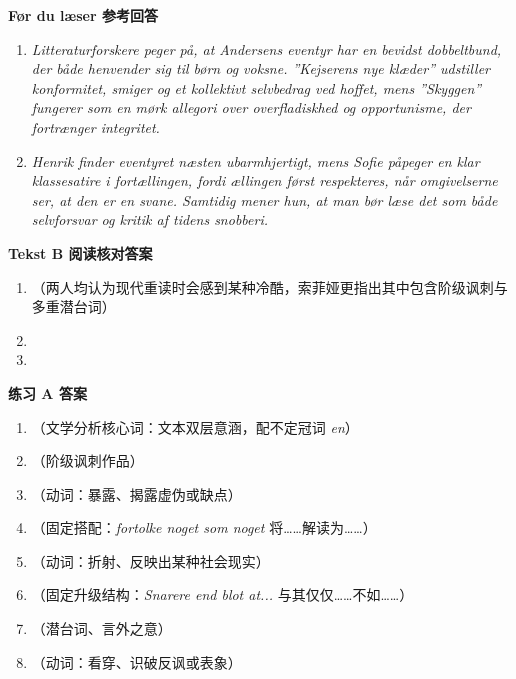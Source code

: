 \begin{answerbox}
\textbf{Før du læser 参考回答}
\begin{enumerate}
  \item \textit{Litteraturforskere peger på, at Andersens eventyr har en bevidst dobbeltbund, der både henvender sig til børn og voksne. ”Kejserens nye klæder” udstiller konformitet, smiger og et kollektivt selvbedrag ved hoffet, mens ”Skyggen” fungerer som en mørk allegori over overfladiskhed og opportunisme, der fortrænger integritet.}
  \item \textit{Henrik finder eventyret næsten ubarmhjertigt, mens Sofie påpeger en klar klassesatire i fortællingen, fordi ællingen først respekteres, når omgivelserne ser, at den er en svane. Samtidig mener hun, at man bør læse det som både selvforsvar og kritik af tidens snobberi.}
\end{enumerate}

\textbf{Tekst B 阅读核对答案}
\begin{enumerate}
  \item {}（两人均认为现代重读时会感到某种冷酷，索菲娅更指出其中包含阶级讽刺与多重潜台词）
  \item {}
  \item {}
\end{enumerate}

\textbf{练习 A 答案}
\begin{enumerate}
  \item {}（文学分析核心词：文本双层意涵，配不定冠词 \textit{en}）
  \item {}（阶级讽刺作品）
  \item {}（动词：暴露、揭露虚伪或缺点）
  \item {}（固定搭配：\textit{fortolke noget som noget} 将……解读为……）
  \item {}（动词：折射、反映出某种社会现实）
  \item {}（固定升级结构：\textit{Snarere end blot at...} 与其仅仅……不如……）
  \item {}（潜台词、言外之意）
  \item {}（动词：看穿、识破反讽或表象）
\end{enumerate}


\end{answerbox}
